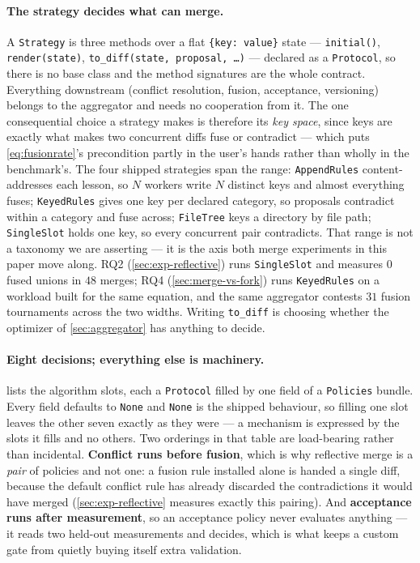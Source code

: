 \documentclass{article}
\newcommand{\code}[1]{\texttt{#1}}
\begin{document}
\paragraph{The strategy decides what can merge.} A \code{Strategy} is three methods over a flat \code{\{key: value\}} state --- \code{initial()}, \code{render(state)}, \code{to\_diff(state, proposal, \ldots)} --- declared as a \code{Protocol}, so there is no base class and the method signatures are the whole contract. Everything downstream (conflict resolution, fusion, acceptance, versioning) belongs to the aggregator and needs no cooperation from it. The one consequential choice a strategy makes is therefore its \emph{key space}, since keys are exactly what makes two concurrent diffs fuse or contradict --- which puts \cref{eq:fusionrate}'s precondition partly in the user's hands rather than wholly in the benchmark's. The four shipped strategies span the range: \code{AppendRules} content-addresses each lesson, so $N$ workers write $N$ distinct keys and almost everything fuses; \code{KeyedRules} gives one key per declared category, so proposals contradict within a category and fuse across; \code{FileTree} keys a directory by file path; \code{SingleSlot} holds one key, so every concurrent pair contradicts. That range is not a taxonomy we are asserting --- it is the axis both merge experiments in this paper move along. RQ2 (\cref{sec:exp-reflective}) runs \code{SingleSlot} and measures $0$ fused unions in $48$ merges; RQ4 (\cref{sec:merge-vs-fork}) runs \code{KeyedRules} on a workload built for the same equation, and the same aggregator contests $31$ fusion tournaments across the two widths. Writing \code{to\_diff} is choosing whether the optimizer of \cref{sec:aggregator} has anything to decide.

\paragraph{Eight decisions; everything else is machinery.}  lists the algorithm slots, each a \code{Protocol} filled by one field of a \code{Policies} bundle. Every field defaults to \code{None} and \code{None} is the shipped behaviour, so filling one slot leaves the other seven exactly as they were --- a mechanism is expressed by the slots it fills and no others. Two orderings in that table are load-bearing rather than incidental. \textbf{Conflict runs before fusion}, which is why reflective merge is a \emph{pair} of policies and not one: a fusion rule installed alone is handed a single diff, because the default conflict rule has already discarded the contradictions it would have merged (\cref{sec:exp-reflective} measures exactly this pairing). And \textbf{acceptance runs after measurement}, so an acceptance policy never evaluates anything --- it reads two held-out measurements and decides, which is what keeps a custom gate from quietly buying itself extra validation.
\end{document}
